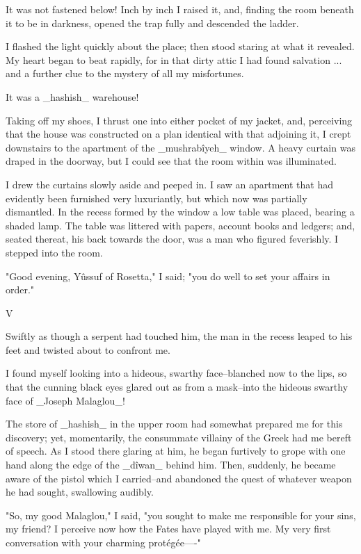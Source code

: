 It was not fastened below! Inch by inch I raised it, and, finding the
room beneath it to be in darkness, opened the trap fully and descended
the ladder.

I flashed the light quickly about the place; then stood staring at
what it revealed. My heart began to beat rapidly, for in that dirty
attic I had found salvation ... and a further clue to the mystery of
all my misfortunes.

It was a _hashish_ warehouse!

Taking off my shoes, I thrust one into either pocket of my jacket,
and, perceiving that the house was constructed on a plan identical
with that adjoining it, I crept downstairs to the apartment of the
_mushrabîyeh_ window. A heavy curtain was draped in the doorway, but
I could see that the room within was illuminated.

I drew the curtains slowly aside and peeped in. I saw an apartment
that had evidently been furnished very luxuriantly, but which now was
partially dismantled. In the recess formed by the window a low table
was placed, bearing a shaded lamp. The table was littered with papers,
account books and ledgers; and, seated thereat, his back towards the
door, was a man who figured feverishly. I stepped into the room.

"Good evening, Yûssuf of Rosetta," I said; "you do well to set your
affairs in order."


V

Swiftly as though a serpent had touched him, the man in the recess
leaped to his feet and twisted about to confront me.

I found myself looking into a hideous, swarthy face--blanched now to
the lips, so that the cunning black eyes glared out as from a
mask--into the hideous swarthy face of _Joseph Malaglou_!

The store of _hashish_ in the upper room had somewhat prepared me for
this discovery; yet, momentarily, the consummate villainy of the Greek
had me bereft of speech. As I stood there glaring at him, he began
furtively to grope with one hand along the edge of the _dîwan_ behind
him. Then, suddenly, he became aware of the pistol which I
carried--and abandoned the quest of whatever weapon he had sought,
swallowing audibly.

"So, my good Malaglou," I said, "you sought to make me responsible for
your sins, my friend? I perceive now how the Fates have played with
me. My very first conversation with your charming protégée----"

